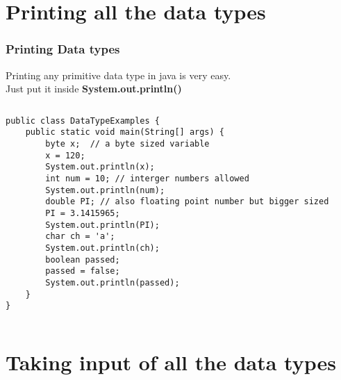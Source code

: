 \documentclass{beamer}
\begin{document}
\section{Printing all the data types}

\begin{frame}[fragile]
\frametitle{Printing Data types}
Printing any primitive data type in java is very easy.\\
Just put it inside \textbf{System.out.println()}

\begin{columns}[T]
\begin{column}{\textwidth}
\begin{lstlisting}
public class DataTypeExamples {
    public static void main(String[] args) {
        byte x;  // a byte sized variable
        x = 120;
        System.out.println(x);
        int num = 10; // interger numbers allowed
        System.out.println(num);
        double PI; // also floating point number but bigger sized
        PI = 3.1415965;
        System.out.println(PI);
        char ch = 'a';
        System.out.println(ch);
        boolean passed;
        passed = false;
        System.out.println(passed);
    }
}

\end{lstlisting}
\end{column}
\end{columns}
\end{frame}


\section{Taking input of all the data types}
\end{document}
